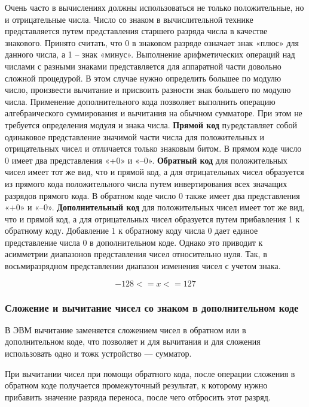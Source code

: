 \documentclass[a4paper]{article}
\begin{document}
Очень часто в вычислениях должны использоваться не только положительные, но и отрицательные числа. Число со знаком в вычислительной технике представляется путем представления старшего разряда числа в качестве знакового. Принято считать, что 0 в знаковом разряде означает знак «плюс» для данного числа, а 1 – знак «минус». Выполнение арифметических операций над числами с разными знаками представляется для аппаратной части довольно сложной процедурой. В этом случае нужно определить большее по модулю число, произвести вычитание и присвоить разности знак большего по модулю числа. Применение дополнительного кода позволяет выполнить операцию алгебраического суммирования и вычитания на обычном сумматоре. При этом не требуется определения модуля и знака числа. \linebreak
\textbf{Прямой код} пyредставляет собой одинаковое представление значимой части числа для положительных и отрицательных чисел и отличается только знаковым битом. В прямом коде число 0 имеет два представления «+0» и «–0». \linebreak
\textbf{Обратный код} для положительных чисел имеет тот же вид, что и прямой код, а для отрицательных чисел образуется из прямого кода положительного числа путем инвертирования всех значащих разрядов прямого кода. В обратном коде число 0 также имеет два представления «+0» и «–0». \linebreak
\textbf{Дополнительный код} для положительных чисел имеет тот же вид, что и прямой код, а для отрицательных чисел образуется путем прибавления 1 к обратному коду. Добавление 1 к обратному коду числа 0 дает единое представление числа 0 в дополнительном коде. Однако это приводит к асимметрии диапазонов представления чисел относительно нуля. Так, в восьмиразрядном представлении диапазон изменения чисел с учетом знака. \linebreak

\[-128 <= x <= 127\]

\subsubsection{Сложение и вычитание чисел со знаком в дополнительном коде}

В ЭВМ вычитание заменяется сложением чисел в обратном или в дополнительном коде, что позволяет и для вычитания и для сложения использовать одно и тожк устройство --- сумматор.

При вычитании чисел при помощи обратного кода, после операции сложения в обратном коде получается промежуточный результат, к которому нужно прибавить значение разряда переноса, после чего отбросить этот разряд.
\end{document}
